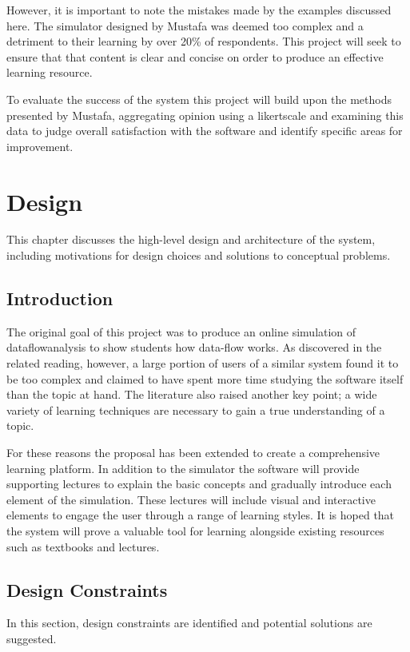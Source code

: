 \documentclass[bsc,twoside,singlespacing,parskip,logo,notimes,normalheadings]{infthesis}
\begin{document}
    However, it is important to note the mistakes made by the examples
    discussed here. The simulator designed by Mustafa was deemed too
    complex\cite[p. 103]{mustafa2010} and a detriment to their
    learning by over 20\% of respondents. This project will seek to
    ensure that that content is clear and concise on order to produce
    an effective learning resource.

    To evaluate the success of the system this project will build upon
    the methods presented by Mustafa, aggregating opinion using a
    \gls{likertscale} and examining this data to judge overall
    satisfaction with the software and identify specific areas for
    improvement.


\chapter{Design}
This chapter discusses the high-level design and architecture of the
system, including motivations for design choices and solutions to
conceptual problems.

    \section{Introduction}
    The original goal of this project was to produce an online
    simulation of \gls{dataflowanalysis} to show students how
    data-flow works. As discovered in the related reading, however, a
    large portion of users of a similar system found it to be too
    complex and claimed to have spent more time studying the software
    itself than the topic at hand. The literature also raised another
    key point; a wide variety of learning techniques are necessary to
    gain a true understanding of a topic.

    For these reasons the proposal has been extended to create a
    comprehensive learning platform. In addition to the simulator the
    software will provide supporting lectures to explain the basic
    concepts and gradually introduce each element of the
    simulation. These lectures will include visual and interactive
    elements to engage the user through a range of learning styles. It
    is hoped that the system will prove a valuable tool for learning
    alongside existing resources such as textbooks and lectures.

    \section{Design Constraints}
    In this section, design constraints are identified and potential
    solutions are suggested.
\end{document}
